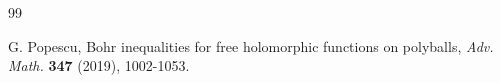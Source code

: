 \documentclass[a4paper,12pt]{amsart}
\theoremstyle{definition}
\begin{document}
\begin{thebibliography}{99}
	
	 {\sc G. Popescu}, Bohr inequalities for free holomorphic functions on polyballs, {\it Adv. Math.} {\bf 347} (2019), 1002-1053.
	
	
	
	
	
	
	
	
	
	
	
	

\end{thebibliography}
\end{document}
